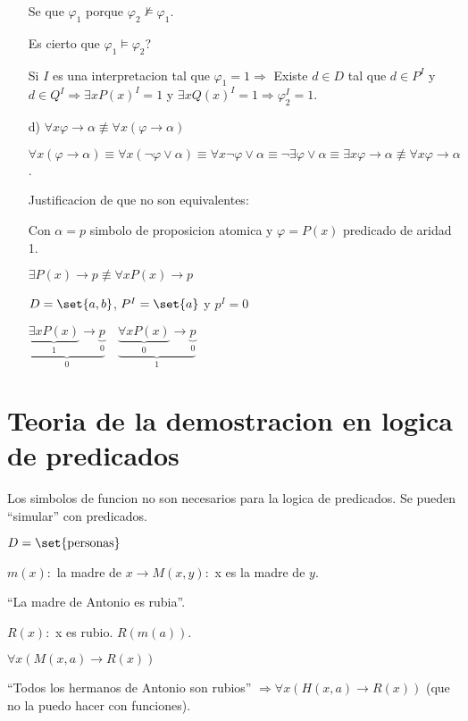 \begin{example}
\begin{enumerate}
			Se que \(\varphi_1 \) porque \(\varphi_2 \not\vDash \varphi_1 \).

			Es cierto que \(\varphi_1 \vDash \varphi_2\)?


			Si \(I \) es una interpretacion tal que \(\varphi_1 = 1 \Rightarrow \) Existe  \(d \in D \) tal que \(d \in P^{I } \) y \(d \in Q^{I } \Rightarrow \exists x P(x)^{I} = 1 \) y \(\exists  x Q(x)^{I} = 1 \Rightarrow \varphi^{I}_2 = 1  \).

		\item[d)] \(\forall x \varphi \to \alpha \not\equiv \forall x (\varphi \to \alpha)\)

			\(\forall x (\varphi \to \alpha) \equiv \forall x (\neg \varphi \vee \alpha) \equiv \forall x \neg \varphi \vee \alpha \equiv \neg \exists \varphi\vee \alpha \equiv \exists x \varphi \to \alpha \not\equiv \forall x \varphi \to \alpha\).

			Justificacion de que no son equivalentes:

			Con \(\alpha = p\) simbolo de proposicion atomica y \(\varphi = P(x )\) predicado de aridad 1.

			\(\exists P(x) \to p \not\equiv \forall x P(x) \to p \)

			\(D = \set{a,b}\), \(P^{I} = \set{a} \) y \(p^{I} = 0 \)

			\(\underbrace{\underbrace{\exists  x P(x)}_1 \to \underbrace{p}_0}_0 \quad \underbrace{\underbrace{\forall x P(x)}_0 \to \underbrace{p}_0}_1 \)
	\end{enumerate}
\end{example}

\part{Teoria de la demostracion en logica de predicados}

\begin{remark}
	Los simbolos de funcion no son necesarios para la logica de predicados. Se pueden ``simular'' con predicados.
\end{remark}

\begin{example}
	\(D = \set{\text{personas} }\)

	\(m(x) \colon\) la madre de \(x \rightarrow M(x,y):\) x es la madre de \(y \).

	``La madre de Antonio es rubia''.

	\(R(x) \colon  \) x es rubio. \(R(m(a ))\).

	\(\forall x (M(x,a) \rightarrow R(x ))\)

	``Todos los hermanos de Antonio son rubios'' \(\Rightarrow \forall x (H(x,a) \rightarrow R(x ))\) (que no la puedo hacer con funciones).
\end{example}

